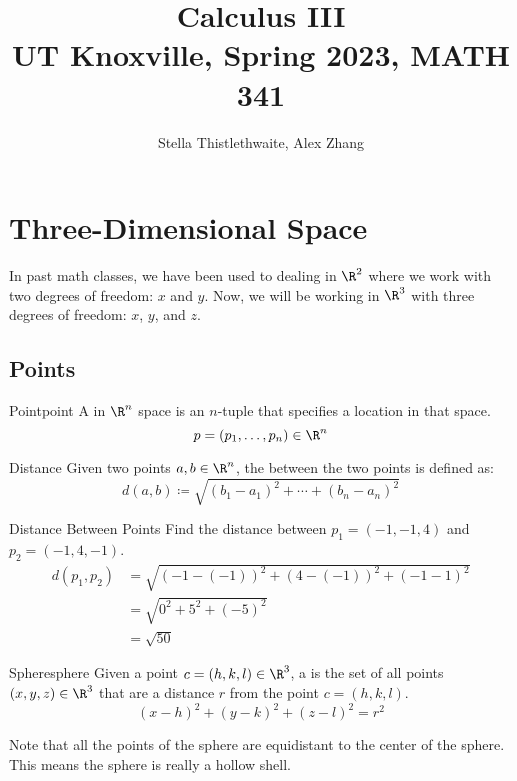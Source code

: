 \documentclass[12pt]{report}
\title{\textbf{Calculus III}\\
\large UT Knoxville, Spring 2023, MATH 341}
\author{Stella Thistlethwaite, Alex Zhang}
\begin{document}
\maketitle
\tableofcontents

\chapter{Three-Dimensional Space}
In past math classes, we have been used to dealing in $\R^2$ where we work with two degrees of freedom: $x$ and $y$. Now, we will be working in $\R^3$ with three degrees of freedom: $x$, $y$, and $z$.

\section{Points}

\begin{dfnbox}{Point}{point}
    A  in $\R^n$ space is an $n$-tuple that specifies a location in that space.
    \tcblower
    \[ p = (p_1, \ldots, p_n) \in \R^n \]
\end{dfnbox}

\begin{dfnbox}{Distance}{}
    Given two points $a, b\in \R^n$, the  between the two points is defined as:
    \[ d(a, b) \coloneq \sqrt{ (b_1 - a_1)^2 + \cdots + (b_n - a_n)^2} \]
\end{dfnbox}

\begin{exbox}{Distance Between Points}{}
    Find the distance between $p_1 = (-1, -1, 4)$ and $p_2 = (-1, 4, -1)$.
    \tcblower
    \begin{align*}
         d(p_1, p_2) &= \sqrt{ (-1-(-1))^2 + (4-(-1))^2 + (-1-1)^2 } \\
         &= \sqrt{ 0^2 + 5^2 + (-5)^2 } \\
         &= \sqrt{ 50 }
    \end{align*}
\end{exbox}

\begin{dfnbox}{Sphere}{sphere}
    Given a point $c = (h, k, l) \in \R^3$, a  is the set of all points $(x,y,z) \in \R^3$ that are a distance $r$ from the point $c = (h,k,l)$.
    \tcblower
    \[ (x-h)^2 + (y-k)^2 + (z-l)^2 = r^2 \]
\end{dfnbox}

Note that all the points of the sphere are equidistant to the center of the sphere. This means the sphere is really a hollow shell.
\end{document}
